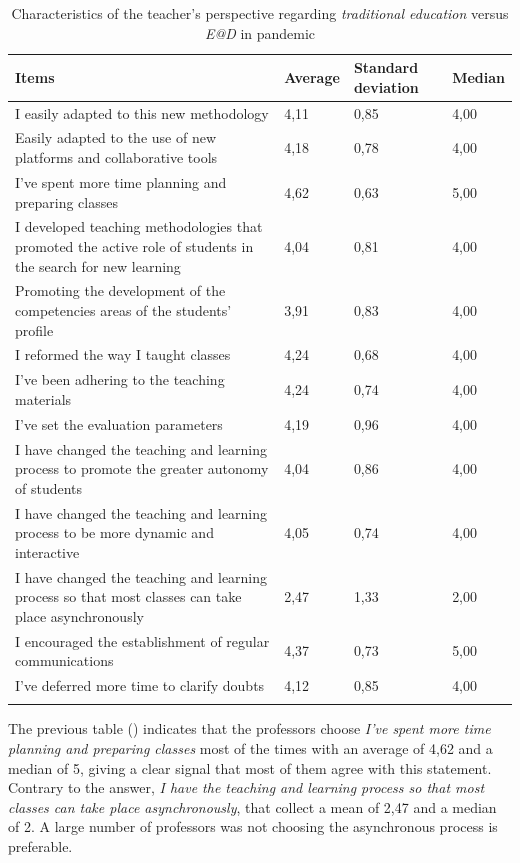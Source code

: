 \documentclass{textolivre}
\begin{document}
\begin{table}[htpb]
\caption{Characteristics of the teacher's perspective regarding \emph{traditional education} versus \emph{E@D} in pandemic}
\label{tab4}
\centering
\small
\begin{tabular}{p{}p{}p{}p{}}
\toprule
Items & Average & Standard deviation & Median
\\
\midrule
\arrayrulecolor[gray]{.7}
I easily adapted to this new methodology & 4,11 & 0,85 & 4,00
\\
Easily adapted to the use of new platforms and collaborative tools & 4,18 & 0,78 & 4,00
\\
I've spent more time planning and preparing classes & 4,62 & 0,63 & 5,00
\\
I developed teaching methodologies that promoted the active role of students in the search for new learning & 4,04 & 0,81 & 4,00
\\
Promoting the development of the competencies areas of the students' profile & 3,91 & 0,83 & 4,00
\\
I reformed the way I taught classes & 4,24 & 0,68 & 4,00
\\
I've been adhering to the teaching materials & 4,24 & 0,74 & 4,00	\\
I've set the evaluation parameters & 4,19 & 0,96 & 4,00
\\
I have changed the teaching and learning process to promote the greater autonomy of students & 4,04 & 0,86 & 4,00
\\
I have changed the teaching and learning process to be more dynamic and interactive & 4,05 & 0,74 & 4,00
\\
I have changed the teaching and learning process so that most classes can take place asynchronously & 2,47 & 1,33 & 2,00
\\
I encouraged the establishment of regular communications & 4,37 & 0,73 & 5,00
\\
I've deferred more time to clarify doubts & 4,12 & 0,85 & 4,00	
\\
\arrayrulecolor{black}
\bottomrule
\end{tabular}
\centering
{}
\end{table}

The previous table () indicates that the professors choose \emph{I've spent more time planning and preparing classes} most of the times with an average of 4,62 and a median of 5, giving a clear signal that most of them agree with this statement. Contrary to the answer, \emph{I have the teaching and learning process so that most classes can take place asynchronously}, that collect a mean of 2,47 and a median of 2. A large number of professors was not choosing the asynchronous process is preferable.
\end{document}
